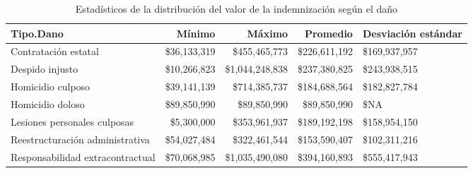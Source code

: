 \begin{table}[htbp]
\centering
\caption{Estadísticos de la distribución del
valor de la indemnización según el daño} 
\label{tab:indemnizacion-dano}
\begin{tabular}{p{3cm}rrrR{2cm}}
  \hline
Tipo.Dano & Mínimo & Máximo & Promedio & Desviación estándar \\ 
  \hline
Contratación estatal & \$36,133,319 & \$455,465,773 & \$226,611,192 & \$169,937,957 \\ 
  Despido injusto & \$10,266,823 & \$1,044,248,838 & \$237,380,825 & \$243,938,515 \\ 
  Homicidio culposo & \$39,141,139 & \$714,385,737 & \$184,688,564 & \$182,827,784 \\ 
  Homicidio doloso & \$89,850,990 & \$89,850,990 & \$89,850,990 & \$NA \\ 
  Lesiones personales culposas & \$5,300,000 & \$353,961,937 & \$189,192,198 & \$158,954,150 \\ 
  Reestructuración administrativa & \$54,027,484 & \$322,461,544 & \$153,590,407 & \$102,311,216 \\ 
  Responsabilidad extracontractual & \$70,068,985 & \$1,035,490,080 & \$394,160,893 & \$555,417,943 \\ 
   \hline
\end{tabular}
\end{table}
